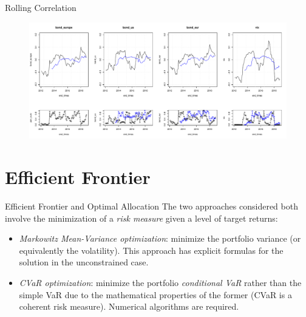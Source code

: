 \documentclass{beamer}
\begin{document}
\begin{frame}{Rolling Correlation}
\begin{figure}
\includegraphics[width=\textwidth]{rolling_bonds.pdf}
\label{roll_stocks}
\end{figure}
\end{frame}

\section{Efficient Frontier}

\begin{frame}{Efficient  Frontier and Optimal Allocation}
The two approaches considered both involve the minimization of a \textit{risk measure} given a level of target returns:
\begin{itemize}
	\item \textit{Markowitz Mean-Variance optimization}:  minimize the portfolio variance (or equivalently the volatility). This approach has explicit formulas for the solution in the unconstrained case.
	\item \textit{CVaR optimization}: minimize the portfolio \textit{conditional VaR} rather than the simple VaR due to the mathematical properties of the former (CVaR is a coherent risk measure). Numerical algorithms are required.
\end{itemize}
\end{frame}
\end{document}
